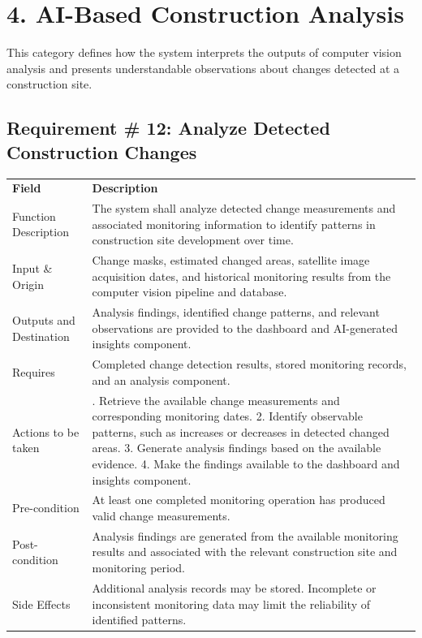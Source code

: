\documentclass[12pt,a4paper]{report}
\begin{document}
\section{4. AI-Based Construction
Analysis}\label{ai-based-construction-analysis-1}

This category defines how the system interprets the outputs of computer
vision analysis and presents understandable observations about changes
detected at a construction site.

\subsection{Requirement \# 12: Analyze Detected Construction
Changes}\label{requirement-12-analyze-detected-construction-changes}

\begin{longtable}[]{@{}
  >{\raggedright\arraybackslash}p{}
  >{\raggedright\arraybackslash}p{}@{}}
\toprule\noalign{}
\endhead
\bottomrule\noalign{}
\endlastfoot
\textbf{Field} & \textbf{Description} \\
Function Description & The system shall analyze detected change
measurements and associated monitoring information to identify patterns
in construction site development over time. \\
Input \& Origin & Change masks, estimated changed areas, satellite image
acquisition dates, and historical monitoring results from the computer
vision pipeline and database. \\
Outputs and Destination & Analysis findings, identified change patterns,
and relevant observations are provided to the dashboard and AI-generated
insights component. \\
Requires & Completed change detection results, stored monitoring
records, and an analysis component. \\
Actions to be taken & 1. Retrieve the available change measurements and
corresponding monitoring dates. 2. Identify observable patterns, such as
increases or decreases in detected changed areas. 3. Generate analysis
findings based on the available evidence. 4. Make the findings available
to the dashboard and insights component. \\
Pre-condition & At least one completed monitoring operation has produced
valid change measurements. \\
Post-condition & Analysis findings are generated from the available
monitoring results and associated with the relevant construction site
and monitoring period. \\
Side Effects & Additional analysis records may be stored. Incomplete or
inconsistent monitoring data may limit the reliability of identified
patterns. \\
\end{longtable}
\end{document}
